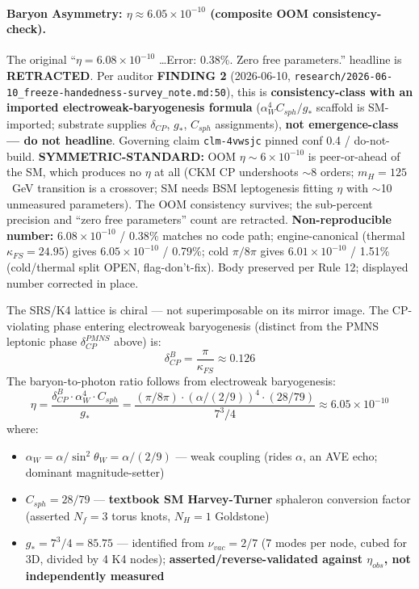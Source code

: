 \paragraph{Baryon Asymmetry: $\eta \approx 6.05 \times 10^{-10}$ (composite OOM consistency-check).}
\label{sec:baryon_asymmetry_derivation}
\begin{warningbox}
\footnotesize
The original ``$\eta = 6.08\times10^{-10}$ \dots Error: 0.38\%. Zero free
parameters.'' headline is \textbf{RETRACTED}. Per auditor \textbf{FINDING 2}
(2026-06-10, \texttt{research/2026-06-10\_freeze-handedness-survey\_note.md:50}),
this is \textbf{consistency-class with an imported electroweak-baryogenesis
formula} ($\alpha_W^4 C_{sph}/g_*$ scaffold is SM-imported; substrate supplies
$\delta_{CP}$, $g_*$, $C_{sph}$ assignments), \textbf{not emergence-class ---
do not headline}. Governing claim \texttt{clm-4vwsjc} pinned conf 0.4 /
do-not-build. \textbf{SYMMETRIC-STANDARD:} OOM $\eta \sim 6\times10^{-10}$ is
peer-or-ahead of the SM, which produces no $\eta$ at all (CKM CP undershoots
$\sim$8 orders; $m_H = 125$~GeV transition is a crossover; SM needs BSM
leptogenesis fitting $\eta$ with $\sim$10 unmeasured parameters). The OOM
consistency survives; the sub-percent precision and ``zero free parameters''
count are retracted. \textbf{Non-reproducible number:} $6.08\times10^{-10}$ /
$0.38\%$ matches no code path; engine-canonical (thermal $\kappa_{FS} = 24.95$)
gives $6.05\times10^{-10}$ / 0.79\%; cold $\pi/8\pi$ gives
$6.01\times10^{-10}$ / 1.51\% (cold/thermal split OPEN, flag-don't-fix). Body
preserved per Rule 12; displayed number corrected in place.
\end{warningbox}
The SRS/K4 lattice is chiral --- not superimposable on its mirror
image.  The CP-violating phase entering electroweak baryogenesis (distinct from the PMNS leptonic phase $\delta_{CP}^{PMNS}$ above) is:
\begin{equation}
    \delta_{CP}^{B} = \frac{\pi}{\kappa_{FS}} \approx 0.126
\end{equation}
The baryon-to-photon ratio follows from electroweak baryogenesis:
\begin{equation}
    \eta = \frac{\delta_{CP}^{B} \cdot \alpha_W^4 \cdot C_{sph}}{g_*}
    = \frac{(\pi/8\pi) \cdot (\alpha/(2/9))^4 \cdot (28/79)}{7^3/4}
    \approx 6.05 \times 10^{-10}
\end{equation}
where:
\begin{itemize}
    \item $\alpha_W = \alpha/\sin^2\theta_W = \alpha/(2/9)$ --- weak coupling (rides $\alpha$, an AVE echo; dominant magnitude-setter)
    \item $C_{sph} = 28/79$ --- \textbf{textbook SM Harvey-Turner} sphaleron conversion factor (asserted $N_f = 3$ torus knots, $N_H = 1$ Goldstone)
    \item $g_* = 7^3/4 = 85.75$ --- identified from $\nu_{vac} = 2/7$ (7 modes per node, cubed for 3D, divided by 4 K4 nodes); \textbf{asserted/reverse-validated against $\eta_{obs}$, not independently measured}
\end{itemize}
